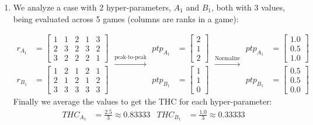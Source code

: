 \documentclass[10pt]{article} %
\begin{document}
\begin{enumerate}
    \item We analyze a case with 2 hyper-parameters, $A_1$ and $B_1$, both with 3 values, being evaluated across 5 games (columns are ranks in a game):

    \begin{equation*}
    \begin{aligned}
        r_{A_1} &= \begin{bmatrix}
                    1 & 1 & 2 & 1 & 3\\
                    2 & 3 & 2 & 3 & 2\\
                    3 & 2 & 2 & 2 & 1
                    \end{bmatrix} \\
        r_{B_1} &= \begin{bmatrix}
                    1 & 2 & 1 & 2 & 1\\
                    2 & 1 & 2 & 1 & 2\\
                    3 & 3 & 3 & 3 & 3
                    \end{bmatrix}
    \end{aligned}
    \xrightarrow{\text{peak-to-peak}}
    \begin{aligned}
        ptp_{A_1} &= \begin{bmatrix}
                    2\\
                    1\\
                    2
                    \end{bmatrix} \\
        ptp_{B_1} &= \begin{bmatrix}
                    1\\
                    1\\
                    0
                    \end{bmatrix}
    \end{aligned}
    \xrightarrow{\text{Normalize}}
    \begin{aligned}
        ptp_{A_1} &= \begin{bmatrix}
                    1.0\\
                    0.5\\
                    1.0
                    \end{bmatrix} \\
        ptp_{B_1} &= \begin{bmatrix}
                    0.5\\
                    0.5\\
                    0.0
                    \end{bmatrix}
    \end{aligned}
    \end{equation*}
    Finally we average the values to get the THC for each hyper-parameter:
        \begin{align}
            THC_{A_1} &= \frac{2.5}{3} \approx 0.83333  & THC_{B_1} &= \frac{1.0}{3} \approx 0.33333
        \end{align}


\end{enumerate}
\end{document}

